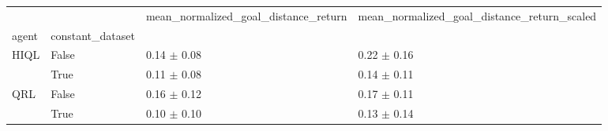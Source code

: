 \begin{tabular}{llll}
\toprule
 &  & mean_normalized_goal_distance_return & mean_normalized_goal_distance_return_scaled \\
agent & constant_dataset &  &  \\
\midrule
\multirow[t]{2}{*}{HIQL} & False & 0.14 $\pm$ 0.08 & 0.22 $\pm$ 0.16 \\
 & True & 0.11 $\pm$ 0.08 & 0.14 $\pm$ 0.11 \\
\cline{1-4}
\multirow[t]{2}{*}{QRL} & False & 0.16 $\pm$ 0.12 & 0.17 $\pm$ 0.11 \\
 & True & 0.10 $\pm$ 0.10 & 0.13 $\pm$ 0.14 \\
\cline{1-4}
\bottomrule
\end{tabular}
